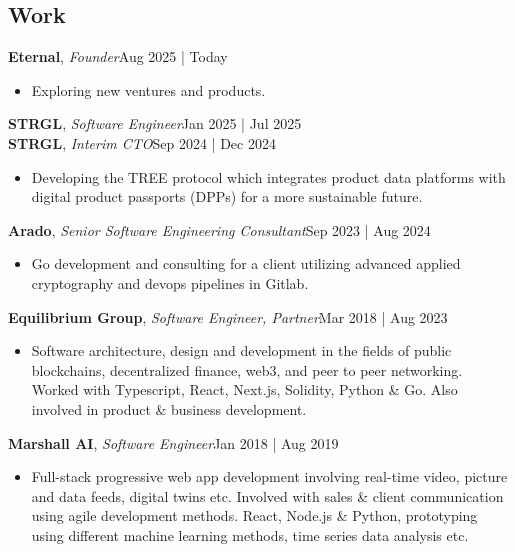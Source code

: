 \documentclass[line,margin]{res}
\begin{document}
\address{jani.anttonen@protonmail.ch | Turku, Finland | https://janianttonen.com}

\begin{resume}
	\vspace{-5mm}

	\section{Work}
	\textbf{Eternal}, {\sl Founder}\hfill Aug 2025 | Today\\
	\begin{itemize} \itemsep 3pt
	\item Exploring new ventures and products.
	\end{itemize}
	
	\textbf{STRGL}, {\sl Software Engineer}\hfill Jan 2025 | Jul 2025\\
	\textbf{STRGL}, {\sl Interim CTO}\hfill Sep 2024 | Dec 2024\\
	\begin{itemize} \itemsep 3pt
	\item Developing the TREE protocol which integrates product data platforms with digital product passports (DPPs) for a more sustainable future.
	\end{itemize}
 
	\textbf{Arado}, {\sl Senior Software Engineering Consultant}\hfill Sep 2023 | Aug 2024\\
	\begin{itemize} \itemsep 3pt
	\item Go development and consulting for a client utilizing advanced applied cryptography and devops pipelines in Gitlab.
	\end{itemize}
 
	\textbf{Equilibrium Group}, {\sl Software Engineer, Partner}\hfill Mar 2018 | Aug 2023\\
	\begin{itemize} \itemsep 3pt
	\item Software architecture, design and development in the fields of public blockchains, decentralized finance, web3, and peer to peer networking. Worked with Typescript, React, Next.js, Solidity, Python \& Go. Also involved in product \& business development.
	\end{itemize}

	\textbf{Marshall AI}, {\sl Software Engineer}\hfill Jan 2018 | Aug 2019\\
	\begin{itemize} \itemsep 3pt
	\item Full-stack progressive web app development involving real-time video, picture and data feeds, digital twins etc. Involved with sales \& client communication using agile development methods. React, Node.js \& Python, prototyping using different machine learning methods, time series data analysis etc.
	\end{itemize}


\end{resume}
\end{document}
